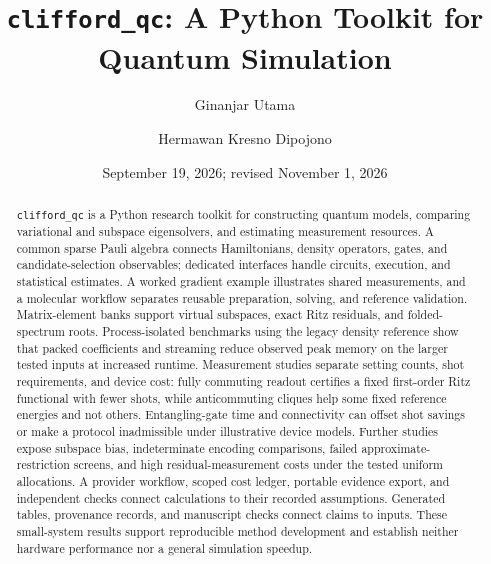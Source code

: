 \documentclass[aps,pra,reprint,superscriptaddress,nofootinbib,floatfix,
  showkeys]{revtex4-2}
\newcommand{\pkg}{\texttt{clifford\_qc}}
\begin{document}
\title{\pkg{}: A Python Toolkit for Quantum Simulation}

\author{Ginanjar Utama}

\author{Hermawan Kresno Dipojono}

\date{September 19, 2026; revised November 1, 2026}

\begin{abstract}
\pkg{} is a Python research toolkit for constructing quantum models, comparing
variational and subspace eigensolvers, and estimating measurement resources.
A common sparse Pauli algebra connects Hamiltonians, density operators, gates,
and candidate-selection observables; dedicated interfaces handle circuits,
execution, and statistical estimates. A worked gradient example illustrates
shared measurements, and a molecular workflow separates reusable preparation,
solving, and reference validation. Matrix-element banks support virtual
subspaces, exact Ritz residuals, and folded-spectrum roots. Process-isolated
benchmarks using the legacy density reference show that packed coefficients and
streaming reduce observed peak memory on the larger tested inputs at increased
runtime. Measurement studies
separate setting counts, shot requirements, and device cost: fully commuting
readout certifies a fixed first-order Ritz functional with fewer shots, while
anticommuting cliques help some fixed reference energies and not others.
Entangling-gate time and connectivity can offset shot savings or make a
protocol inadmissible under illustrative device models. Further studies expose
subspace bias, indeterminate encoding comparisons, failed approximate-restriction
screens, and high residual-measurement costs under the tested uniform
allocations. A provider workflow, scoped cost ledger, portable evidence export, and
independent checks connect calculations to their recorded assumptions. Generated
tables, provenance records, and manuscript checks connect claims to inputs. These
small-system results support reproducible method development and establish
neither hardware performance nor a general simulation speedup.
\end{abstract}

\end{document}
